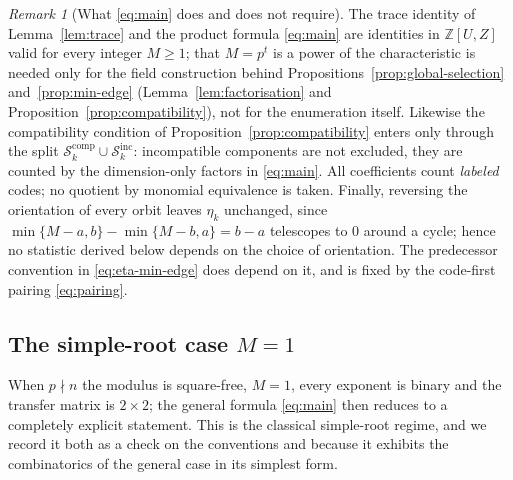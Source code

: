 \documentclass[preprint,12pt,a4paper]{elsarticle}
\theoremstyle{definition}
\theoremstyle{remark}
\newtheorem{remark}[theorem]{Remark}
\begin{document}
\begin{remark}[What \eqref{eq:main} does and does not require]
\label{rem:hypotheses}
The trace identity of Lemma~\ref{lem:trace} and the product formula
\eqref{eq:main} are identities in $\mathbb{Z}[U,Z]$ valid for every integer
$M\geq1$; that $M=p^t$ is a power of the characteristic is needed only for the
field construction behind Propositions~\ref{prop:global-selection}
and~\ref{prop:min-edge} (Lemma~\ref{lem:factorisation}
and Proposition~\ref{prop:compatibility}), not for the enumeration itself. Likewise the
compatibility condition of Proposition~\ref{prop:compatibility} enters only
through the split $\mathcal{S}_k^{\mathrm{comp}}\cup\mathcal{S}_k^{\mathrm{inc}}$:
incompatible components are not excluded, they are counted by the
dimension-only factors in \eqref{eq:main}. All coefficients count \emph{labeled}
codes; no quotient by monomial equivalence is taken. Finally, reversing the
orientation of every orbit leaves $\eta_k$ unchanged, since
$\min\{M-a,b\}-\min\{M-b,a\}=b-a$ telescopes to $0$ around a cycle; hence no
statistic derived below depends on the choice of orientation. The predecessor
convention in \eqref{eq:eta-min-edge} does depend on it, and is fixed by the
code-first pairing \eqref{eq:pairing}.
\end{remark}

\subsection{The simple-root case \texorpdfstring{$M=1$}{M=1}}\label{sec:M1}

When $p\nmid n$ the modulus is square-free, $M=1$, every exponent is binary and
the transfer matrix is $2\times2$; the general formula
\eqref{eq:main} then reduces to a completely explicit statement. This is the
classical simple-root regime, and we record it both as a check on the
conventions and because it exhibits the combinatorics of the general case in
its simplest form.
\end{document}
